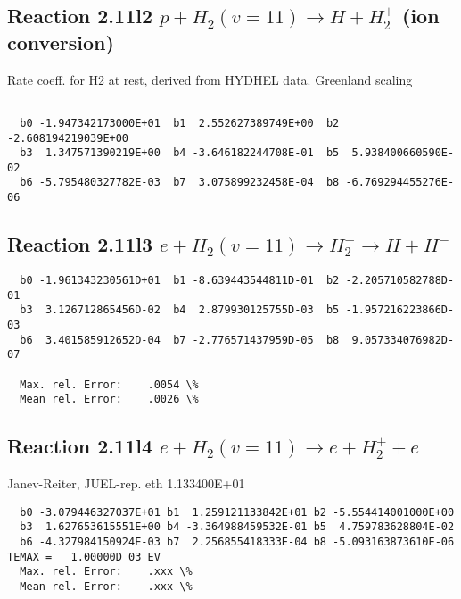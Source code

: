 \documentclass[12pt,dvipdfmx]{article}
\begin{document}
\subsection{
Reaction 2.11l2
$ p + H_2(v=11) \rightarrow H + H_2^+$ (ion conversion)
}
Rate coeff. for H2 at rest, derived from HYDHEL data. Greenland scaling


\begin{small}\begin{verbatim}

  b0 -1.947342173000E+01  b1  2.552627389749E+00  b2 -2.608194219039E+00
  b3  1.347571390219E+00  b4 -3.646182244708E-01  b5  5.938400660590E-02
  b6 -5.795480327782E-03  b7  3.075899232458E-04  b8 -6.769294455276E-06

\end{verbatim}\end{small}

\newpage


\subsection{
Reaction 2.11l3
 $ e + H_2(v=11) \rightarrow H_2^- \rightarrow H + H^-$
}


\begin{small}\begin{verbatim}
  b0 -1.961343230561D+01  b1 -8.639443544811D-01  b2 -2.205710582788D-01
  b3  3.126712865456D-02  b4  2.879930125755D-03  b5 -1.957216223866D-03
  b6  3.401585912652D-04  b7 -2.776571437959D-05  b8  9.057334076982D-07

  Max. rel. Error:    .0054 \%
  Mean rel. Error:    .0026 \%
\end{verbatim}\end{small}

\subsection{
Reaction 2.11l4
 $ e + H_2(v=11) \rightarrow e + H_2^+  + e$
}
Janev-Reiter, JUEL-rep. eth 1.133400E+01

\begin{small}\begin{verbatim}
  b0 -3.079446327037E+01 b1  1.259121133842E+01 b2 -5.554414001000E+00
  b3  1.627653615551E+00 b4 -3.364988459532E-01 b5  4.759783628804E-02
  b6 -4.327984150924E-03 b7  2.256855418333E-04 b8 -5.093163873610E-06
TEMAX =   1.00000D 03 EV
  Max. rel. Error:    .xxx \%
  Mean rel. Error:    .xxx \%
\end{verbatim}\end{small}
\newpage
\end{document}
